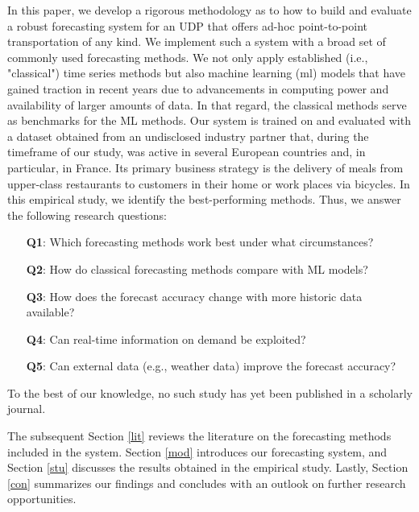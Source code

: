 In this paper, we develop a rigorous methodology as to how to build and
    evaluate a robust forecasting system for an UDP
    that offers ad-hoc point-to-point transportation of any kind.
We implement such a system with a broad set of commonly used forecasting
    methods.
We not only apply established (i.e., "classical") time series methods but also
    machine learning (\gls{ml}) models that have gained traction in recent
    years due to advancements in computing power and availability of larger
    amounts of data.
In that regard, the classical methods serve as benchmarks for the ML methods.
Our system is trained on and evaluated with a dataset obtained from an
    undisclosed industry partner that, during the timeframe of our study, was
    active in several European countries and, in particular, in France.
Its primary business strategy is the delivery of meals from upper-class
    restaurants to customers in their home or work places via bicycles.
In this empirical study, we identify the best-performing methods.
Thus, we answer the following research questions:
\begin{enumerate}
\item[\textbf{Q1}:]
    Which forecasting methods work best under what circumstances?
\item[\textbf{Q2}:]
    How do classical forecasting methods compare with ML models?
\item[\textbf{Q3}:]
    How does the forecast accuracy change with more historic data available?
\item[\textbf{Q4}:]
    Can real-time information on demand be exploited?
\item[\textbf{Q5}:]
    Can external data (e.g., weather data) improve the forecast accuracy?
\end{enumerate}
To the best of our knowledge, no such study has yet been published in a
    scholarly journal.

The subsequent Section \ref{lit} reviews the literature on the forecasting
    methods included in the system.
Section \ref{mod} introduces our forecasting system, and Section \ref{stu}
    discusses the results obtained in the empirical study.
Lastly, Section \ref{con} summarizes our findings and concludes
    with an outlook on further research opportunities.